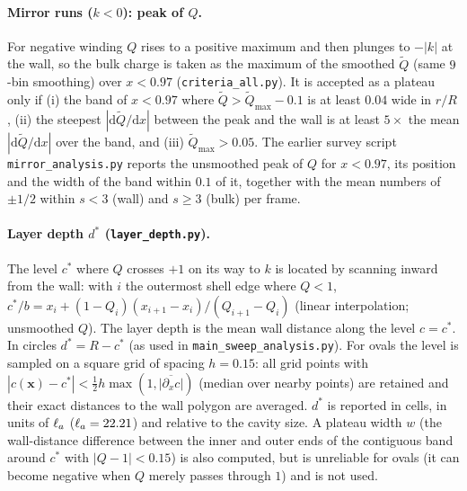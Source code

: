 \paragraph{Mirror runs ($k<0$): peak of $Q$.}
For negative winding $Q$ rises to a positive maximum and then plunges to $-|k|$ at the wall, so the
bulk charge is taken as the maximum of the smoothed $\tilde Q$ (same $9$-bin smoothing) over
$x<0.97$ (\texttt{criteria\_all.py}). It is accepted as a plateau only if (i) the band of $x<0.97$
where $\tilde Q>\tilde Q_{\max}-0.1$ is at least $0.04$ wide in $r/R$, (ii) the steepest
$|\mathrm{d}\tilde Q/\mathrm{d}x|$ between the peak and the wall is at least $5\times$ the mean
$|\mathrm{d}\tilde Q/\mathrm{d}x|$ over the band, and (iii) $\tilde Q_{\max}>0.05$. The earlier survey
script \texttt{mirror\_analysis.py} reports the unsmoothed peak of $Q$ for $x<0.97$, its position and
the width of the band within $0.1$ of it, together with the mean numbers of $\pm1/2$ within $s<3$
(wall) and $s\ge3$ (bulk) per frame.

\paragraph{Layer depth $d^*$ (\texttt{layer\_depth.py}).}
\label{sec:methods-dstar}
The level $c^*$ where $Q$ crosses $+1$ on its way to $k$ is located by scanning inward from the
wall: with $i$ the outermost shell edge where $Q<1$,
$c^*/b = x_i + (1-Q_i)(x_{i+1}-x_i)/(Q_{i+1}-Q_i)$ (linear interpolation; unsmoothed $Q$).
The layer depth is the mean wall distance along the level $c=c^*$. In circles $d^*=R-c^*$
(as used in \texttt{main\_sweep\_analysis.py}). For ovals the level is sampled on a square grid of
spacing $h=0.15$: all grid points with $|c(\mathbf{x})-c^*|<\tfrac12 h\max(1,\overline{|\partial_x c|})$
(median over nearby points) are retained and their exact distances to the wall polygon are averaged.
$d^*$ is reported in cells, in units of $\ell_a$ ($\ell_a=22.21$) and relative to the cavity size.
A plateau width $w$ (the wall-distance difference between the inner and outer ends of the contiguous
band around $c^*$ with $|Q-1|<0.15$) is also computed, but is unreliable for ovals (it can become
negative when $Q$ merely passes through $1$) and is not used.


